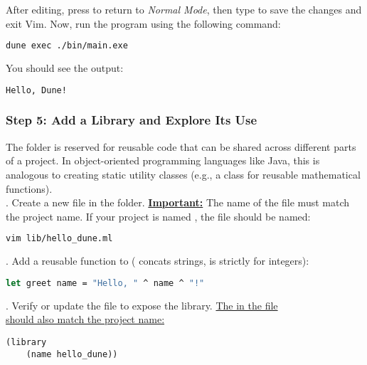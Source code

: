 \noindent
After editing, press  to return to \textit{Normal Mode}, then type  to save the changes and exit Vim.
Now, run the program using the following command:

\begin{lstlisting}[language=Bash, caption={Running the Program}]
    dune exec ./bin/main.exe
\end{lstlisting}

\noindent
You should see the output:
\begin{lstlisting}[language=Bash]
    Hello, Dune!
\end{lstlisting}


\subsubsection{Step 5: Add a Library and Explore Its Use}

The  folder is reserved for reusable code that can be shared across different parts of a project. 
In object-oriented programming languages like Java, this is analogous to creating static utility classes 
(e.g., a  class for reusable mathematical functions).\\

. Create a new file in the  folder. \underline{\textbf{Important:}} The name of the file must match the project name. 
   If your project is named , the file should be named:
   \begin{lstlisting}[language=Bash]
   vim lib/hello_dune.ml
   \end{lstlisting}

\vspace{.5em}
. Add a reusable function to  (\snippet{ $^\wedge$} concats strings, \snippet{+} is strictly for integers):
   \begin{lstlisting}[language=OCaml]
   let greet name = "Hello, " ^ name ^ "!"
   \end{lstlisting}

\vspace{.5em}
. Verify or update the  file to expose the library. \underline{The  in the  file}\\
   \underline{should also match the project name:}
   \begin{lstlisting}[language=PlainText]
   (library
    (name hello_dune))
   \end{lstlisting}

